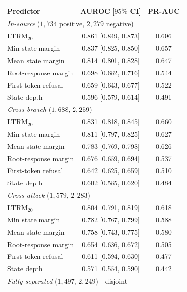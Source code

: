 \documentclass[11pt]{article}
\newcommand{\ltrm}{LTRM}
\begin{document}
\begin{table}[t]
  \centering
  \footnotesize
  \setlength{\tabcolsep}{5pt}
  \begin{tabular}{lcc}
    \toprule
    Predictor & AUROC [\(95\%\) CI] & PR-AUC \\
    \midrule
    \multicolumn{3}{l}{\emph{In-source} (\(1{,}734\) positive, \(2{,}279\) negative)} \\
    \ltrm{}\(_{20}\)         & 0.861 [0.849, 0.873] & 0.696 \\
    Min state margin         & 0.837 [0.825, 0.850] & 0.657 \\
    Mean state margin        & 0.814 [0.801, 0.828] & 0.647 \\
    Root-response margin     & 0.698 [0.682, 0.716] & 0.544 \\
    First-token refusal      & 0.659 [0.643, 0.677] & 0.522 \\
    State depth              & 0.596 [0.579, 0.614] & 0.491 \\
    \midrule
    \multicolumn{3}{l}{\emph{Cross-branch} (\(1{,}688\), \(2{,}259\))} \\
    \ltrm{}\(_{20}\)         & 0.831 [0.818, 0.845] & 0.660 \\
    Min state margin         & 0.811 [0.797, 0.825] & 0.627 \\
    Mean state margin        & 0.783 [0.769, 0.798] & 0.626 \\
    Root-response margin     & 0.676 [0.659, 0.694] & 0.537 \\
    First-token refusal      & 0.642 [0.625, 0.659] & 0.510 \\
    State depth              & 0.602 [0.585, 0.620] & 0.484 \\
    \midrule
    \multicolumn{3}{l}{\emph{Cross-attack} (\(1{,}579\), \(2{,}283\))} \\
    \ltrm{}\(_{20}\)         & 0.804 [0.791, 0.819] & 0.618 \\
    Min state margin         & 0.782 [0.767, 0.799] & 0.588 \\
    Mean state margin        & 0.758 [0.743, 0.775] & 0.580 \\
    Root-response margin     & 0.654 [0.636, 0.672] & 0.505 \\
    First-token refusal      & 0.611 [0.594, 0.630] & 0.477 \\
    State depth              & 0.571 [0.554, 0.590] & 0.442 \\
    \midrule
    \multicolumn{3}{l}{\emph{Fully separated} (\(1{,}497\), \(2{,}249\))---disjoint
}
\end{tabular}
\end{table}
\end{document}
